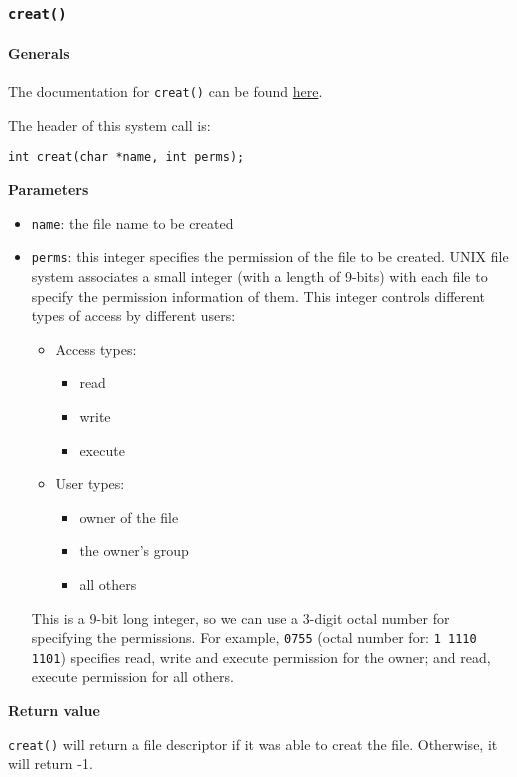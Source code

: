 \documentclass[12pt]{article}
\begin{document}
\subsubsection{\texttt{creat()}}
\label{sec:org7041d9d}
\paragraph{Generals}
\label{sec:orgad221b2}
The documentation for \texttt{creat()} can be found \href{https://linux.die.net/man/3/creat}{here}.

The header of this system call is:
\begin{verbatim}
int creat(char *name, int perms);
\end{verbatim}
\textbf{Parameters}
\begin{itemize}
\item \texttt{name}: the file name to be created
\item \texttt{perms}: this integer specifies the permission of the file to be created. UNIX file system associates a small integer (with a length of 9-bits) with each file to specify the permission information of them. This integer controls different types of access by different users:
\begin{itemize}
\item Access types:
\begin{itemize}
\item read
\item write
\item execute
\end{itemize}
\item User types:
\begin{itemize}
\item owner of the file
\item the owner's group
\item all others
\end{itemize}
\end{itemize}
This is a 9-bit long integer, so we can use a 3-digit octal number for specifying the permissions. For example, \texttt{0755} (octal number for: \texttt{1 1110 1101}) specifies read, write and execute permission for the owner; and read, execute permission for all others.
\end{itemize}


\textbf{Return value}

\texttt{creat()} will return a file descriptor if it was able to creat the file. Otherwise, it will return -1.
\end{document}
